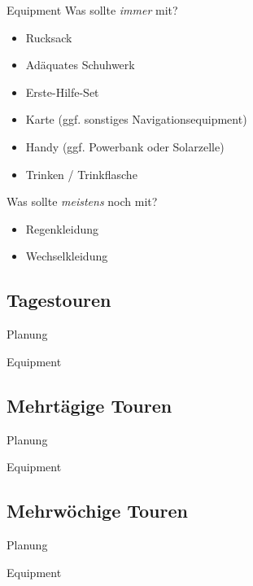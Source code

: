 \documentclass{beamer}
\begin{document}
		\begin{frame}{Equipment}
			Was sollte \textit{immer} mit?
			\begin{itemize}
				\item Rucksack
				\item Adäquates Schuhwerk
				\item Erste-Hilfe-Set
				\item Karte (ggf. sonstiges Navigationsequipment)
				\item Handy (ggf. Powerbank oder Solarzelle)
				\item Trinken / Trinkflasche
			\end{itemize}\pause
			Was sollte \textit{meistens} noch mit?
			\begin{itemize}
				\item Regenkleidung
				\item Wechselkleidung
			\end{itemize}
		\end{frame}
	
		\subsection{Tagestouren}
			
			\begin{frame}{Planung}
			\end{frame}
			
			\begin{frame}{Equipment}
			\end{frame}
			
		\subsection{Mehrtägige Touren}
		
			\begin{frame}{Planung}
			\end{frame}
			
			\begin{frame}{Equipment}
			\end{frame}
		
		\subsection{Mehrwöchige Touren}
		
			\begin{frame}{Planung}
			\end{frame}
			
			\begin{frame}{Equipment}
			\end{frame}
		
\end{document}
